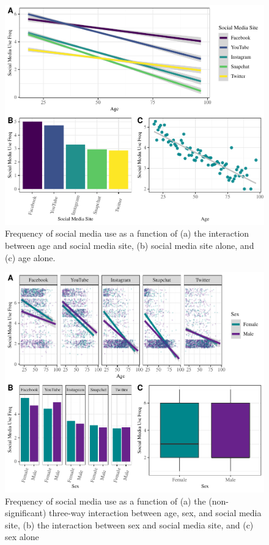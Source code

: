 \documentclass[man, fleqn, noextraspace]{apa6}
\theoremstyle{definition}
\theoremstyle{definition}
\theoremstyle{definition}
\theoremstyle{remark}
\begin{document}
\begin{figure}
\centering
\includegraphics{final_manuscript_files/figure-latex/fig1-1.pdf}
\caption{\label{fig:fig1}Frequency of social media use as a function of (a)
the interaction between age and social media site, (b) social media site
alone, and (c) age alone.}
\end{figure}

\begin{figure}
\centering
\includegraphics{final_manuscript_files/figure-latex/fig2-1.pdf}
\caption{\label{fig:fig2}Frequency of social media use as a function of (a)
the (non-significant) three-way interaction between age, sex, and social
media site, (b) the interaction between sex and social media site, and
(c) sex alone}
\end{figure}
\end{document}
